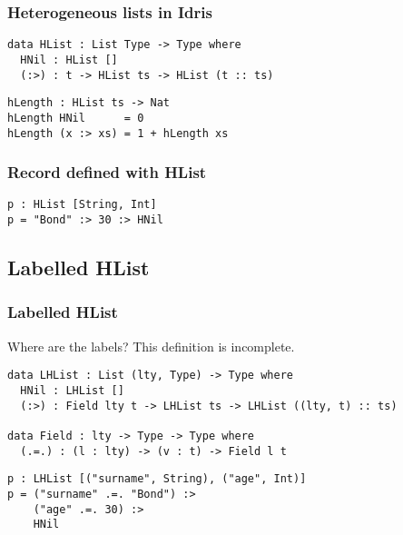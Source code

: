 \documentclass{beamer}
\begin{document}
\begin{frame}[fragile]
\frametitle{Heterogeneous lists in Idris}

\begin{definition}
\begin{verbatim}
data HList : List Type -> Type where
  HNil : HList []
  (:>) : t -> HList ts -> HList (t :: ts)
\end{verbatim}
\end{definition}

\pause

\begin{definition}
\begin{verbatim}
hLength : HList ts -> Nat
hLength HNil      = 0
hLength (x :> xs) = 1 + hLength xs
\end{verbatim}
\end{definition}

\end{frame}

\begin{frame}[fragile]
\frametitle{Record defined with HList}

\begin{example}
\begin{verbatim}
p : HList [String, Int]
p = "Bond" :> 30 :> HNil
\end{verbatim}
\end{example}

\end{frame}

\subsection{Labelled HList}

\begin{frame}[fragile]
\frametitle{Labelled HList}

Where are the labels? This definition is incomplete.

\pause

\begin{definition}
\begin{verbatim}
data LHList : List (lty, Type) -> Type where
  HNil : LHList []
  (:>) : Field lty t -> LHList ts -> LHList ((lty, t) :: ts)

data Field : lty -> Type -> Type where
  (.=.) : (l : lty) -> (v : t) -> Field l t
\end{verbatim}
\end{definition}

\pause

\begin{example}
\begin{verbatim}
p : LHList [("surname", String), ("age", Int)]
p = ("surname" .=. "Bond") :> 
    ("age" .=. 30) :> 
    HNil
\end{verbatim}
\end{example}

\end{frame}
\end{document}
